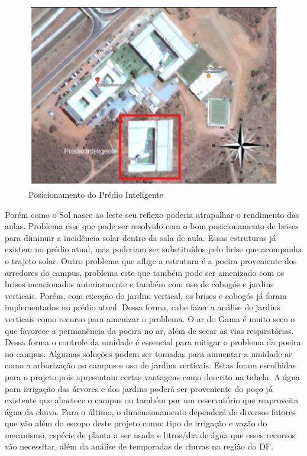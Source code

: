 \begin{figure}[!ht]
  \centering
  \includegraphics[keepaspectratio=true,scale=1]{figuras/posicionamentodoprediointeligente.eps}
  \caption{Posicionamento do Prédio Inteligente}
  \label{fig:posicionamento}
\end{figure}

Porém como o Sol nasce ao leste seu reflexo poderia atrapalhar o rendimento das aulas. Problema esse que pode ser resolvido com o bom posicionamento de brises para diminuir a incidência solar dentro da sala de aula. Essas estruturas já existem no prédio atual, mas poderiam ser substituídos pelo brise que acompanha o trajeto solar.
Outro problema que aflige a estrutura é a poeira proveniente dos arredores do campus, problema este que também pode ser amenizado com os brises mencionados anteriormente e também com uso de cobogós e jardins verticais. Porém, com exceção do jardim vertical, os brises e cobogós já foram implementados no prédio atual. Dessa forma, cabe fazer a análise de jardins verticais como recurso para amenizar o problema.
O ar do Gama é muito seco o que favorece a permanência da poeira no ar, além de secar as vias respiratórias. Dessa forma o controle da umidade é essencial para mitigar o problema da poeira no campus. Algumas soluções podem ser tomadas para aumentar a umidade ar como a arborização no campus e uso de jardins verticais. Estas foram escolhidas para o projeto pois apresentam certas vantagens como descrito na tabela. A água para irrigação das árvores e dos jardins poderá ser proveniente do poço já existente que abastece o campus ou também por um reservatório que reaproveita água da chuva. Para o último, o dimensionamento dependerá de diversos fatores que vão além do escopo deste projeto como: tipo de irrigação e vazão do mecanismo, espécie de planta a ser usada e litros/dia de água que esses recursos vão necessitar, além da análise de temporadas de chuvas na região do DF.

